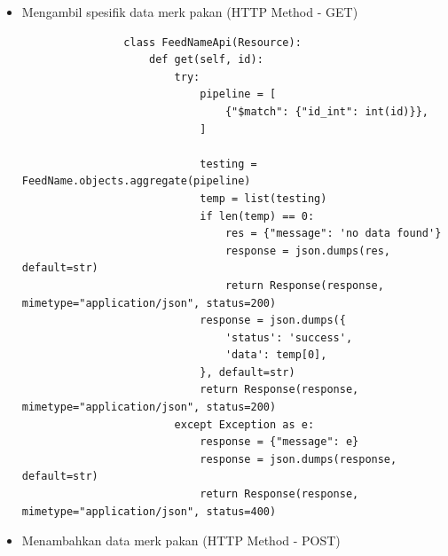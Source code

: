 \begin{spacing}{1.5}
\begin{enumerate}
\begin{itemize}
			\begin{lstlisting}
				class FeedNamesApi(Resource):
					@jwt_required()
					def get(self):
						try:
							current_user = get_jwt_identity()
							farm = str(current_user['farm_id'])
							farm_id = ObjectId(farm)
				
							type = request.args.get('type') if request.args.get('type') else ""
				
							pipeline = [
								{"$sort": {"id_int": 1}},
								{
									'$match': {
										"farm_id": farm_id,
										'type': {
											'$regex': type,
											'$options': 'i'
										}
									}
								}
							]
				
							testing = FeedName.objects.aggregate(pipeline)
							temp = list(testing)
							response = json.dumps({
								'status': 'success',
								'data': temp,
							}, default=str)
							return Response(response, mimetype="application/json", status=200)
						except Exception as e:
							response = {"message": e}
							response = json.dumps(response, default=str)
							return Response(response, mimetype="application/json", status=400)
			\end{lstlisting}

			\item Mengambil spesifik data merk pakan (HTTP Method - GET)
			
			\begin{lstlisting}
				class FeedNameApi(Resource):
					def get(self, id):
						try:
							pipeline = [
								{"$match": {"id_int": int(id)}},
							]
					
							testing = FeedName.objects.aggregate(pipeline)
							temp = list(testing)
							if len(temp) == 0:
								res = {"message": 'no data found'}
								response = json.dumps(res, default=str)
								return Response(response, mimetype="application/json", status=200)
							response = json.dumps({
								'status': 'success',
								'data': temp[0],
							}, default=str)
							return Response(response, mimetype="application/json", status=200)
						except Exception as e:
							response = {"message": e}
							response = json.dumps(response, default=str)
							return Response(response, mimetype="application/json", status=400)
			\end{lstlisting}

			\item Menambahkan data merk pakan (HTTP Method - POST)
			

\end{itemize}
\end{enumerate}
\end{spacing}
